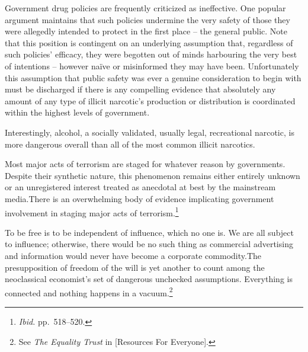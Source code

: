 Government drug policies are frequently criticized as ineffective. One popular argument maintains that such policies undermine the very safety of those they were allegedly intended to protect in the first place -- the general public. Note that this position is contingent on an underlying assumption that, regardless of such policies' efficacy, they were begotten out of minds harbouring the very best of intentions -- however naïve or misinformed they may have been. Unfortunately this assumption that public safety was ever a genuine consideration to begin with must be discharged if there is any compelling evidence that absolutely any amount of any type of illicit narcotic's production or distribution is coordinated within the highest levels of government.

Interestingly, alcohol, a socially validated, usually legal, recreational narcotic, is more dangerous overall than all of the most common illicit narcotics.\footnotecite[extras={ See figure 2.}][nutt2010]


Most major acts of terrorism are staged for whatever reason by governments. Despite their synthetic nature, this phenomenon remains either entirely unknown or an unregistered interest treated as anecdotal at best by the mainstream media. There is an overwhelming body of evidence implicating government involvement in staging major acts of terrorism.\footnotecite[extras={ p.~193.}][shirer1960]\footnote{{\it Ibid.} pp.~518--520.}\footnotecite[gourley2012]\footnotecite[harrit2009]\footnotecite[shipler2012]\footnotecite[schwartz2013]\footnotecite[northwoods]\footnotecite[king2010]\footnotecite[chossudovsky2005]\footnotecite[interfax2013]\footnotecite[bumiller2010]


To be free is to be independent of influence, which no one is. We are all subject to influence; otherwise, there would be no such thing as commercial advertising and information would never have become a corporate commodity.\footnotecite[santoso2008] The presupposition of freedom of the will is yet another to count among the neoclassical economist's set of dangerous unchecked assumptions. Everything is connected and nothing happens in a vacuum.\footnotecite[drum2013]\footnote{See {\it The Equality Trust} in [Resources For Everyone].} 

